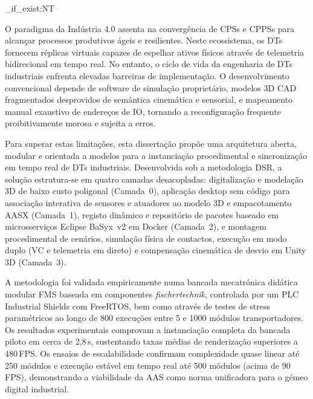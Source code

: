
\ExplSyntaxOn
\cs_if_exist:NT \TitleOnHeader
  { \TitleOnHeader }
\ExplSyntaxOff

%

O paradigma da Indústria 4.0 assenta na convergência de \glspl{CPS} e \glspl{CPPS} para alcançar processos produtivos ágeis e resilientes. Neste ecossistema, os \glspl{DT} fornecem réplicas virtuais capazes de espelhar ativos físicos através de telemetria bidirecional em tempo real. No entanto, o ciclo de vida da engenharia de \glspl{DT} industriais enfrenta elevadas barreiras de implementação. O desenvolvimento convencional depende de software de simulação proprietário, modelos 3D \gls{CAD} fragmentados desprovidos de semântica cinemática e sensorial, e mapeamento manual exaustivo de endereços de \gls{IO}, tornando a reconfiguração frequente proibitivamente morosa e sujeita a erros.

Para superar estas limitações, esta dissertação propõe uma arquitetura aberta, modular e orientada a modelos para a instanciação procedimental e sincronização em tempo real de \glspl{DT} industriais. Desenvolvida sob a metodologia \gls{DSR}, a solução estrutura-se em quatro camadas desacopladas: digitalização e modelação 3D de baixo custo poligonal (Camada~0), aplicação desktop sem código para associação interativa de sensores e atuadores ao modelo 3D e empacotamento \gls{AASX} (Camada~1), registo dinâmico e repositório de pacotes baseado em microsserviços Eclipse BaSyx~v2 em Docker (Camada~2), e montagem procedimental de cenários, simulação física de contactos, execução em modo duplo (\gls{VC} e telemetria em direto) e compensação cinemática de desvio em Unity 3D (Camada~3).

A metodologia foi validada empiricamente numa bancada mecatrónica didática modular \gls{FMS} baseada em componentes \textit{fischertechnik}, controlada por um \gls{PLC} Industrial Shields com FreeRTOS, bem como através de testes de stress paramétricos ao longo de 800 execuções entre 5 e 1000 módulos transportadores. Os resultados experimentais comprovam a instanciação completa da bancada piloto em cerca de 2{,}8\,s, sustentando taxas médias de renderização superiores a 480\,\gls{FPS}. Os ensaios de escalabilidade confirmam complexidade quase linear até 250 módulos e execução estável em tempo real até 500 módulos (acima de 90\,\gls{FPS}), demonstrando a viabilidade da \gls{AAS} como norma unificadora para o gémeo digital industrial.

